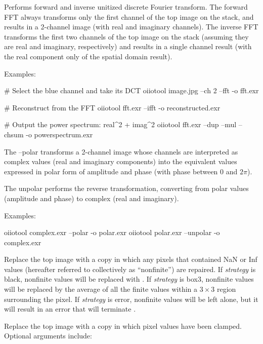 Performs forward and inverse unitized discrete Fourier transform.
The forward FFT always transforms only the first channel of the
top image on the stack, and results in a 2-channel image (with real and
imaginary channels).  The inverse FFT transforms the first two
channels of the top image on the stack (assuming they are real and
imaginary, respectively) and results in a single channel result (with
the real component only of the spatial domain result).

\noindent Examples:
\begin{code}
    # Select the blue channel and take its DCT
    oiiotool image.jpg --ch 2 --fft -o fft.exr

    # Reconstruct from the FFT
    oiiotool fft.exr --ifft -o reconstructed.exr

    # Output the power spectrum: real^2 + imag^2
    oiiotool fft.exr --dup --mul --chsum -o powerspectrum.exr
\end{code}
\apiend


The {\cf --polar} transforms a 2-channel image whose channels are
interpreted as complex values (real and imaginary components) into the
equivalent values expressed in polar form of amplitude and phase (with phase
between $0$ and $2\pi$).

The {\cf unpolar} performs the reverse transformation, converting from 
polar values (amplitude and phase) to complex (real and imaginary).

\noindent Examples:
\begin{code}
    oiiotool complex.exr --polar -o polar.exr
    oiiotool polar.exr --unpolar -o complex.exr
\end{code}
\apiend


Replace the top image with a copy in which any pixels that contained
{\cf NaN} or {\cf Inf} values (hereafter referred to collectively as
``nonfinite'') are repaired.  If \emph{strategy} is {\cf black},
nonfinite values will be replaced with {}.  If \emph{strategy} is
{\cf box3}, nonfinite values will be replaced by the average of all the
finite values within a $3 \times 3$ region surrounding the pixel.
If \emph{strategy} is
{\cf error}, nonfinite values will be left alone, but it will result in an
error that will terminate \oiiotool.
\apiend

Replace the top image with a copy in which pixel values have been
clamped.  Optional arguments include:

